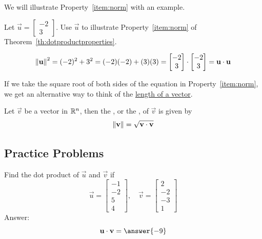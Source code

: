 \documentclass{ximera}
\begin{document}
We will illustrate Property~\ref{item:norm} with an example.

\begin{example}\label{ex:exprop6}
  Let $\vec{u}=\begin{bmatrix}-2\\3\end{bmatrix}$.  Use $\vec{u}$ to illustrate Property~\ref{item:norm} of Theorem~\ref{th:dotproductproperties}.
  \begin{explanation}
  
  $$\left\lVert\mathbf{u}\right\rVert^2=(-2)^2+3^2=(-2)(-2)+(3)(3)=\begin{bmatrix}-2\\3\end{bmatrix}\cdot\begin{bmatrix}-2\\3\end{bmatrix}=\mathbf{u}\cdot\mathbf{u}$$
  \end{explanation}
\end{example}

If we take the square root of both sides of the equation in Property~\ref{item:norm}, we get an alternative way to think of the \href{https://ximera.osu.edu/linearalgebradzv3/LinearAlgebraInteractiveIntro/VEC-0020/main}{length of a vector}.

\begin{corollary}\label{cor:length_via_dotprod}
    Let $\vec{v}$ be a vector in $\mathbb{R}^n$, then the , or the , of $\vec{v}$ is given by
\begin{equation*} \label{eq:norm_dotp} 
\left\lVert\mathbf{v}\right\rVert=\sqrt{\mathbf{v} \cdot \mathbf{v}}
\end{equation*}
\end{corollary}

\subsection*{Practice Problems}

\begin{problem}\label{prob:dotproduct1}
Find the dot product of $\vec{u}$ and $\vec{v}$ if
  $$\vec{u}=\begin{bmatrix}-1\\-2\\5\\4\end{bmatrix},\quad \vec{v}=\begin{bmatrix}2\\-2\\-3\\1\end{bmatrix}$$
  Answer:
  $$\vec{u} \dotp \vec{v} = \answer{-9}$$
\end{problem}
\end{document}
